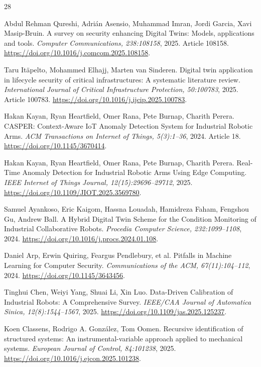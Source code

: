 \begin{thebibliography}{28}
\setlength{\itemsep}{0pt}\setlength{\parsep}{0pt}

 Abdul Rehman Qureshi, Adrián Asensio, Muhammad Imran, Jordi Garcia, Xavi Masip-Bruin. {A survey on security enhancing Digital Twins: Models, applications and tools}. \emph{Computer Communications, 238:108158}, 2025. Article 108158. \url{https://doi.org/10.1016/j.comcom.2025.108158}.

 Taru Itäpelto, Mohammed Elhajj, Marten van Sinderen. {Digital twin application in lifecycle security of critical infrastructures: A systematic literature review}. \emph{International Journal of Critical Infrastructure Protection, 50:100783}, 2025. Article 100783. \url{https://doi.org/10.1016/j.ijcip.2025.100783}.

 Hakan Kayan, Ryan Heartfield, Omer Rana, Pete Burnap, Charith Perera. {CASPER: Context-Aware IoT Anomaly Detection System for Industrial Robotic Arms}. \emph{ACM Transactions on Internet of Things, 5(3):1--36}, 2024. Article 18. \url{https://doi.org/10.1145/3670414}.

 Hakan Kayan, Ryan Heartfield, Omer Rana, Pete Burnap, Charith Perera. {Real-Time Anomaly Detection for Industrial Robotic Arms Using Edge Computing}. \emph{IEEE Internet of Things Journal, 12(15):29696--29712}, 2025. \url{https://doi.org/10.1109/JIOT.2025.3569780}.

 Samuel Ayankoso, Eric Kaigom, Hassna Louadah, Hamidreza Faham, Fengshou Gu, Andrew Ball. {A Hybrid Digital Twin Scheme for the Condition Monitoring of Industrial Collaborative Robots}. \emph{Procedia Computer Science, 232:1099--1108}, 2024. \url{https://doi.org/10.1016/j.procs.2024.01.108}.

 Daniel Arp, Erwin Quiring, Feargus Pendlebury, et al. {Pitfalls in Machine Learning for Computer Security}. \emph{Communications of the ACM, 67(11):104--112}, 2024. \url{https://doi.org/10.1145/3643456}.

 Tinghui Chen, Weiyi Yang, Shuai Li, Xin Luo. {Data-Driven Calibration of Industrial Robots: A Comprehensive Survey}. \emph{IEEE/CAA Journal of Automatica Sinica, 12(8):1544--1567}, 2025. \url{https://doi.org/10.1109/jas.2025.125237}.

 Koen Classens, Rodrigo A. Gonz{\'a}lez, Tom Oomen. {Recursive identification of structured systems: An instrumental-variable approach applied to mechanical systems}. \emph{European Journal of Control, 84:101238}, 2025. \url{https://doi.org/10.1016/j.ejcon.2025.101238}.


\end{thebibliography}
